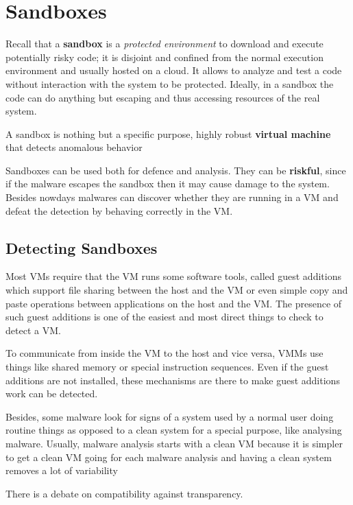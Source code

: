 \section{Sandboxes}
Recall that a \textbf{sandbox} is a \textit{protected environment} to download and execute potentially risky code;
it is disjoint and confined from the normal execution environment and usually hosted
on a cloud.
It allows to analyze and test a code without
interaction with the system to be protected.
Ideally, in a sandbox the code can do anything but escaping and thus accessing resources of the real system.

A sandbox is nothing but a specific purpose, highly robust \textbf{virtual machine}
that detects anomalous behavior 

Sandboxes can be used both for defence and analysis.
They can be \textbf{riskful}, 
since if the malware escapes the sandbox then it may cause damage to the system.
Besides nowdays malwares can discover whether they are running in a VM and defeat the detection by behaving correctly in the VM.

\subsection{Detecting Sandboxes}
Most VMs require that the VM runs some software tools, called guest
additions which support file sharing between the host and the VM or even simple
copy and paste operations between applications on the host and the VM.
The presence of such  guest additions is one of the easiest and most direct things to
check to detect a VM.

To communicate from inside the VM to the host and vice versa, VMMs use
things like shared memory or special instruction sequences.
Even if the guest
additions are not installed, these mechanisms are there to make guest
additions work can be detected.

Besides, some malware look for signs of a system used by a normal user doing routine
things as opposed to a clean system for a special purpose, like analysing
malware.
Usually, malware analysis starts with a clean VM because it is simpler
to get a clean VM going for each malware analysis and having a clean system
removes a lot of variability

There is a debate on compatibility against transparency.